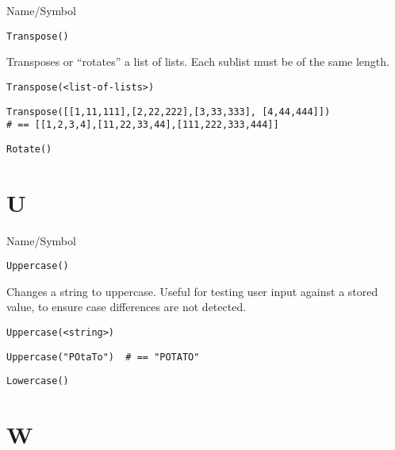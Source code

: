 \rl


\begin{desc}{Name/Symbol}
\item[Name/Symbol]  	\verb+Transpose()+

\item[Description] Transposes or ``rotates'' a list of lists.  Each
  sublist must be of the same length.

\item[Usage]       	
\begin{verbatim}
Transpose(<list-of-lists>)
\end{verbatim}

\item[Example]     	
\begin{verbatim}
Transpose([[1,11,111],[2,22,222],[3,33,333], [4,44,444]])
# == [[1,2,3,4],[11,22,33,44],[111,222,333,444]]
\end{verbatim}

\item[See Also]    	\verb+Rotate()+
\end{desc}

\rl
\section{U}
\rl


\begin{desc}{Name/Symbol}
\item[Name/Symbol]  	\verb+Uppercase()+

\item[Description]  	Changes a string to uppercase.  Useful for testing user
	      	input against a stored value, to ensure case differences
	      	are not detected.

\item[Usage]
\begin{verbatim}
Uppercase(<string>)
\end{verbatim}

\item[Example]     
\begin{verbatim}
Uppercase("POtaTo")  # == "POTATO"
\end{verbatim}

\item[See Also]     	\verb+Lowercase()+
\end{desc}

\rl
\section{W}
\rl


